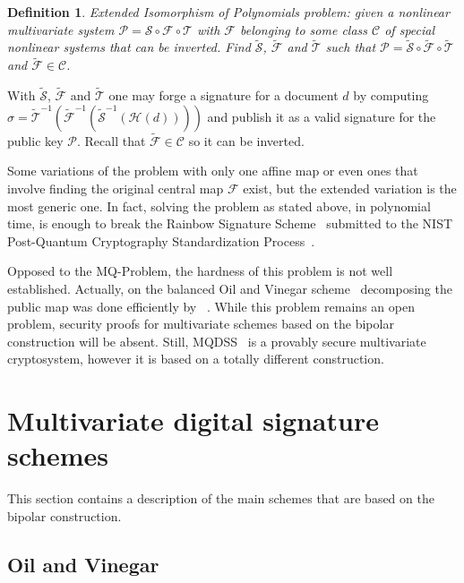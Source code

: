 \documentclass{ufsctex/ufsctex}
\newtheorem{definition}{Definition}
\begin{document}
\begin{definition}
Extended Isomorphism of Polynomials problem: given a nonlinear multivariate
system $\mathcal{P} = \mathcal{S} \circ \mathcal{F} \circ \mathcal{T}$ with
$\mathcal{F}$ belonging to some class $\mathcal{C}$ of special nonlinear
systems that can be inverted. Find $\tilde{\mathcal{S}}$, $\tilde{\mathcal{F}}$
and $\tilde{\mathcal{T}}$ such that $\mathcal{P} = \tilde{\mathcal{S}} \circ
\tilde{\mathcal{F}} \circ \tilde{\mathcal{T}}$ and $\tilde{\mathcal{F}} \in
\mathcal{C}$.
\end{definition}

With $\tilde{\mathcal{S}}$, $\tilde{\mathcal{F}}$ and $\tilde{\mathcal{T}}$ one
may forge a signature for a document $d$ by computing $\sigma =
\tilde{\mathcal{T}}^{-1}(\tilde{\mathcal{F}}^{-1}(\tilde{\mathcal{S}}^{-1}(
\mathcal{H}(d))))$ and publish it as a valid signature for the public key
$\mathcal{P}$. Recall that $\tilde{\mathcal{F}} \in \mathcal{C}$ so it can be
inverted.

Some variations of the problem with only one affine map or even ones that
involve finding the original central map $\mathcal{F}$ exist, but the extended
variation is the most generic one. In fact, solving the problem as stated
above, in polynomial time, is enough to break the Rainbow Signature
Scheme~\cite{ding2005rainbow} submitted to the NIST Post-Quantum Cryptography
Standardization Process~\cite{ding2017nist}.

Opposed to the MQ-Problem, the hardness of this problem is not well
established. Actually, on the balanced Oil and Vinegar
scheme~\cite{patarin1997ov} decomposing the public map was done efficiently by
~\cite{kipnis1998cryptanalysis}. While this problem remains an open problem,
security proofs for multivariate schemes based on the bipolar construction will
be absent. Still, MQDSS~\cite{chen20165} is a provably secure multivariate cryptosystem,
however it is based on a totally different construction.

\section{Multivariate digital signature schemes}\label{sec:mqschemes}

This section contains a description of the main schemes that are based on the
bipolar construction.

\subsection{Oil and Vinegar}\label{sec:ov}
\end{document}
